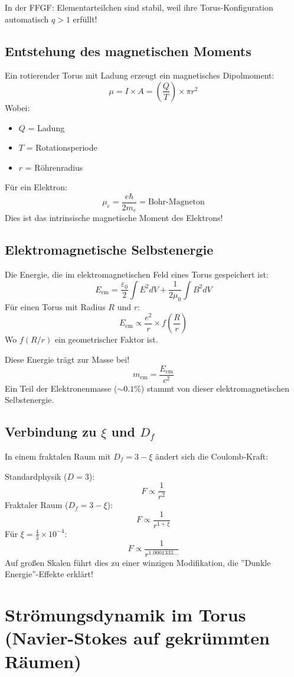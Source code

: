 	In der FFGF: Elementarteilchen sind stabil, weil ihre Torus-Konfiguration automatisch \( q > 1 \) erfüllt!
	
	\subsection{Entstehung des magnetischen Moments}
	Ein rotierender Torus mit Ladung erzeugt ein magnetisches Dipolmoment:
	\[
	\mu = I \times A = \left(\frac{Q}{T}\right) \times \pi r^2
	\]
	Wobei:
	\begin{itemize}
		\item \( Q \) = Ladung
		\item \( T \) = Rotationsperiode
		\item \( r \) = Röhrenradius
	\end{itemize}
	
	Für ein Elektron:
	\[
	\mu_e = \frac{e \hbar}{2 m_e} = \text{Bohr-Magneton}
	\]
	Dies ist das intrinsische magnetische Moment des Elektrons!
	
	\subsection{Elektromagnetische Selbstenergie}
	Die Energie, die im elektromagnetischen Feld eines Torus gespeichert ist:
	\[
	E_{\text{em}} = \frac{\varepsilon_0}{2} \int E^2 dV + \frac{1}{2\mu_0} \int B^2 dV
	\]
	Für einen Torus mit Radius \( R \) und \( r \):
	\[
	E_{\text{em}} \propto \frac{e^2}{r} \times f\left(\frac{R}{r}\right)
	\]
	Wo \( f(R/r) \) ein geometrischer Faktor ist.
	
	Diese Energie trägt zur Masse bei!
	\[
	m_{\text{em}} = \frac{E_{\text{em}}}{c^2}
	\]
	Ein Teil der Elektronenmasse (\( \sim 0.1\% \)) stammt von dieser elektromagnetischen Selbstenergie.
	
	\subsection{Verbindung zu \( \xi \) und \( D_f \)}
	In einem fraktalen Raum mit \( D_f = 3 - \xi \) ändert sich die Coulomb-Kraft:
	
	Standardphysik (\( D = 3 \)):
	\[
	F \propto \frac{1}{r^2}
	\]
	Fraktaler Raum (\( D_f = 3 - \xi \)):
	\[
	F \propto \frac{1}{r^{1 + \xi}}
	\]
	Für \( \xi = \frac{4}{3} \times 10^{-4} \):
	\[
	F \propto \frac{1}{r^{1.0001333\ldots}}
	\]
	Auf großen Skalen führt dies zu einer winzigen Modifikation, die ''Dunkle Energie''-Effekte erklärt!
	
	\section{Strömungsdynamik im Torus (Navier-Stokes auf gekrümmten Räumen)}
